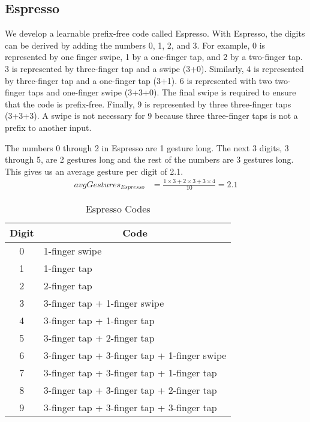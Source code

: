 \subsection{Espresso}
We develop a learnable prefix-free code called Espresso. With Espresso, the digits can be derived by adding the numbers 0, 1, 2, and 3. For example, 0 is represented by one finger swipe, 1 by a one-finger tap, and 2 by a two-finger tap. 3 is represented by three-finger tap and a swipe (3+0). Similarly, 4 is represented by three-finger tap and a one-finger tap (3+1). 6 is represented with two two-finger taps and one-finger swipe (3+3+0). The final swipe is required to ensure that the code is prefix-free. Finally, 9 is represented by three three-finger taps (3+3+3). A swipe is not necessary for 9 because three three-finger taps is not a prefix to another input.
\par
The numbers 0 through 2 in Espresso are 1 gesture long. The next 3 digits, 3 through 5, are 2 gestures long and the rest of the numbers are 3 gestures long. This gives us an average gesture per digit of 2.1.
  \begin{align*}
    avgGestures_{Espresso} &= \frac{1\times3 + 2\times3 + 3\times4}{10} = 2.1
  \end{align*}
  
\begin{table}[ht]
  \caption{Espresso Codes}
  \centering
  \begin{tabular}{cl}
  \hline
  \multicolumn{1}{c}{Digit} & \multicolumn{1}{c}{Code} \\
  \hline
  0 & 1-finger swipe \\
  1 & 1-finger tap \\
  2 & 2-finger tap \\
  3 & 3-finger tap + 1-finger swipe \\
  4 & 3-finger tap + 1-finger tap \\
  5 & 3-finger tap + 2-finger tap \\
  6 & 3-finger tap + 3-finger tap + 1-finger swipe \\
  7 & 3-finger tap + 3-finger tap + 1-finger tap \\
  8 & 3-finger tap + 3-finger tap + 2-finger tap \\
  9 & 3-finger tap + 3-finger tap + 3-finger tap \\ [1ex]
  \hline
  \end{tabular}
  \label{table:nonlin}
\end{table}

